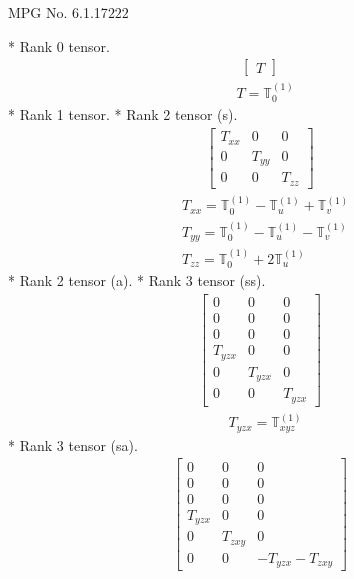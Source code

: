 \documentclass[fleqn,8pt,landscape]{jsarticle}
\begin{document}
\setcounter{MaxMatrixCols}{32}

\renewcommand{\tablename}{Table~}
\renewcommand{\figurename}{Figure~}
\begin{center}
\LARGE
MPG No. 6.1.17\quad$222$
\end{center}
* Rank 0 tensor.
\begin{align*}
\begin{bmatrix} T \end{bmatrix}
\end{align*}
\begin{align*}
& T = \mathbb{T}_{0}^{(1)}
\end{align*}
* Rank 1 tensor.
* Rank 2 tensor (s).
\begin{align*}
\begin{bmatrix} T_{xx} & 0 & 0 \\ 0 & T_{yy} & 0 \\ 0 & 0 & T_{zz} \end{bmatrix}
\end{align*}
\begin{align*}
& T_{xx} = \mathbb{T}_{0}^{(1)} - \mathbb{T}_{u}^{(1)} + \mathbb{T}_{v}^{(1)} \\
& T_{yy} = \mathbb{T}_{0}^{(1)} - \mathbb{T}_{u}^{(1)} - \mathbb{T}_{v}^{(1)} \\
& T_{zz} = \mathbb{T}_{0}^{(1)} + 2 \mathbb{T}_{u}^{(1)}
\end{align*}
* Rank 2 tensor (a).
* Rank 3 tensor (ss).
\begin{align*}
\begin{bmatrix} 0 & 0 & 0 \\ 0 & 0 & 0 \\ 0 & 0 & 0 \\ T_{yzx} & 0 & 0 \\ 0 & T_{yzx} & 0 \\ 0 & 0 & T_{yzx} \end{bmatrix}
\end{align*}
\begin{align*}
& T_{yzx} = \mathbb{T}_{xyz}^{(1)}
\end{align*}
* Rank 3 tensor (sa).
\begin{align*}
\begin{bmatrix} 0 & 0 & 0 \\ 0 & 0 & 0 \\ 0 & 0 & 0 \\ T_{yzx} & 0 & 0 \\ 0 & T_{zxy} & 0 \\ 0 & 0 & - T_{yzx} - T_{zxy} \end{bmatrix}
\end{align*}
\end{document}
